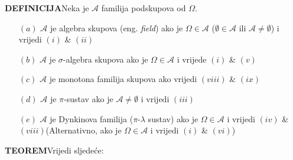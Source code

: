 \documentclass{article}
\begin{document}
 \textbf{DEFINICIJA}\newline Neka je \(\mathcal A\) familija podskupova od \(\Omega.\)
 \begin{enumerate}
     \item[\((a)\)] \(\mathcal A\) je algebra skupova (eng. \textit{field}) ako je \(\Omega\in\mathcal A\) (\(\emptyset\in\mathcal A\) ili \(\mathcal A\ne\emptyset\)) i vrijedi \((i)\) \& \((ii)\)  
     \item[\((b)\)] \(\mathcal A\) je \(\sigma\)-algebra skupova ako je \(\Omega\in\mathcal A\) i vrijede \((i)\) \& \((v)\) 
     \item[\((c)\)] \(\mathcal A\) je monotona familija skupova ako vrijedi \((viii)\) \& \((ix)\) 
     \item[\((d)\)] \(\mathcal A\) je \(\pi\)-sustav ako je \(\mathcal A\ne\emptyset\) i vrijedi \((iii)\) 
     \item[\((e)\)] \(\mathcal A\) je Dynkinova familija (\(\pi\)-\(\lambda\) sustav) ako je \(\Omega\in\mathcal A\) i vrijedi \((iv)\) \& \((viii)\)\newline  (Alternativno, ako je \(\Omega\in\mathcal A\) i vrijedi \((i)\) \& \((vi)\)) 
\end{enumerate}
\textbf{TEOREM}\newline Vrijedi sljedeće:
\end{document}
